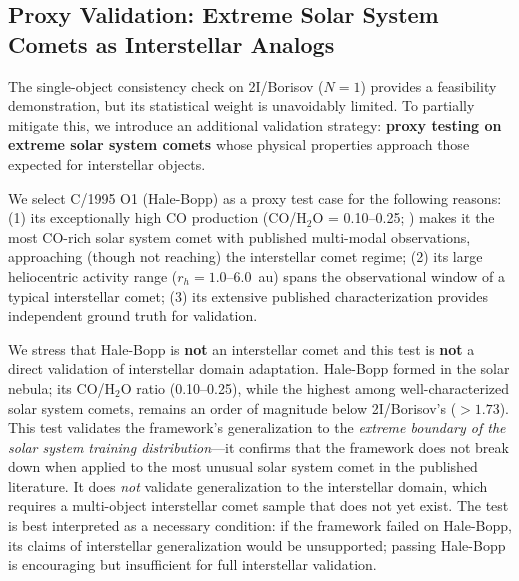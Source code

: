 \documentclass[preprint2]{aastex631}
\begin{document}
\subsection{Proxy Validation: Extreme Solar System Comets as Interstellar Analogs}\label{sec:proxy}

The single-object consistency check on 2I/Borisov ($N=1$) provides a feasibility demonstration, but its statistical weight is unavoidably limited. To partially mitigate this, we introduce an additional validation strategy: \textbf{proxy testing on extreme solar system comets} whose physical properties approach those expected for interstellar objects.

We select C/1995 O1 (Hale-Bopp) as a proxy test case for the following reasons: (1) its exceptionally high CO production (CO/H$_2$O = 0.10--0.25; \citealt{bockelee04}) makes it the most CO-rich solar system comet with published multi-modal observations, approaching (though not reaching) the interstellar comet regime; (2) its large heliocentric activity range ($r_h = 1.0$--6.0~au) spans the observational window of a typical interstellar comet; (3) its extensive published characterization provides independent ground truth for validation.

We stress that Hale-Bopp is \textbf{not} an interstellar comet and this test is \textbf{not} a direct validation of interstellar domain adaptation. Hale-Bopp formed in the solar nebula; its CO/H$_2$O ratio (0.10--0.25), while the highest among well-characterized solar system comets, remains an order of magnitude below 2I/Borisov's ($>1.73$). This test validates the framework's generalization to the \textit{extreme boundary of the solar system training distribution}---it confirms that the framework does not break down when applied to the most unusual solar system comet in the published literature. It does \textit{not} validate generalization to the interstellar domain, which requires a multi-object interstellar comet sample that does not yet exist. The test is best interpreted as a necessary condition: if the framework failed on Hale-Bopp, its claims of interstellar generalization would be unsupported; passing Hale-Bopp is encouraging but insufficient for full interstellar validation.
\end{document}
